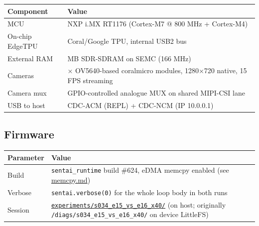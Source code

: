 {\def\LTcaptype{none} %
\begin{longtable}[]{@{}
  >{\raggedright\arraybackslash}p{}
  >{\raggedright\arraybackslash}p{}@{}}
\toprule\noalign{}
\begin{minipage}[b]{\linewidth}\raggedright
Component
\end{minipage} & \begin{minipage}[b]{\linewidth}\raggedright
Value
\end{minipage} \\
\midrule\noalign{}
\endhead
\bottomrule\noalign{}
\endlastfoot
MCU & NXP i.MX RT1176 (Cortex-M7 @ 800 MHz + Cortex-M4) \\
On-chip EdgeTPU & Coral/Google TPU, internal USB2 bus \\
External RAM & 16 MB SDR-SDRAM on SEMC (166 MHz) \\
Cameras & 2× OV5640-based coralmicro modules, 1280×720 native, 15 FPS
streaming \\
Camera mux & GPIO-controlled analogue MUX on shared MIPI-CSI lane \\
USB to host & CDC-ACM (REPL) + CDC-NCM (IP 10.0.0.1) \\
\end{longtable}
}

\subsection{Firmware}\label{firmware}

{\def\LTcaptype{none} %
\begin{longtable}[]{@{}
  >{\raggedright\arraybackslash}p{}
  >{\raggedright\arraybackslash}p{}@{}}
\toprule\noalign{}
\begin{minipage}[b]{\linewidth}\raggedright
Parameter
\end{minipage} & \begin{minipage}[b]{\linewidth}\raggedright
Value
\end{minipage} \\
\midrule\noalign{}
\endhead
\bottomrule\noalign{}
\endlastfoot
Build & \texttt{sentai\_runtime} build \#624, eDMA memcpy enabled (see
\url{memcpy.md}) \\
Verbose & \texttt{sentai.verbose(0)} for the whole loop body in both
runs \\
Session &
\href{../experiments/s034_e15_vs_e16_x40/}{\texttt{experiments/s034\_e15\_vs\_e16\_x40/}}
(on host; originally \texttt{/diags/s034\_e15\_vs\_e16\_x40/} on device
LittleFS) \\
\end{longtable}
}

